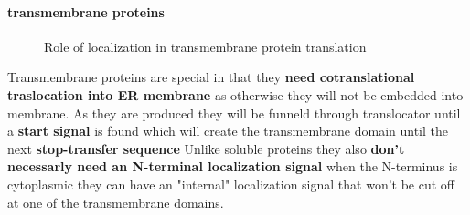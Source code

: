 \documentclass[../main.tex]{subfiles}
\begin{document}
\paragraph{transmembrane proteins}
\begin{figure}[H]
    \centering
    \hspace{0.05\textwidth} %
    \caption{Role of localization in transmembrane protein translation}
    \label{fig:ITC_all}
\end{figure}
Transmembrane proteins are special in that they \textbf{need cotranslational traslocation into ER membrane} as otherwise they will not be embedded into membrane. As they are produced they will be funneld through translocator until a \textbf{start signal }is found which will create the transmembrane domain until the next \textbf{stop-transfer sequence } Unlike soluble proteins they also \textbf{don't necessarly need an N-terminal localization signal} when the N-terminus is cytoplasmic they can have an "internal" localization signal that won't be cut off at one of the transmembrane domains.
\end{document}
